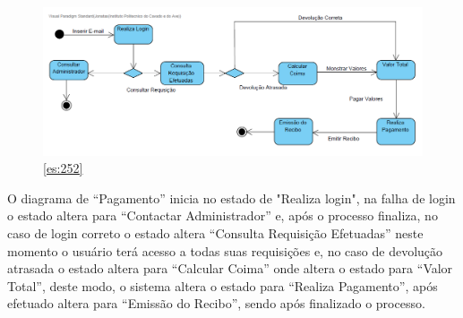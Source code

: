 \subsection{}

\begin{figure}[H]
	\centering
	\includegraphics[width=1\linewidth]{./img/Diagrama_E/DE_Pagamento.png}  %
	\caption{\ref{es:252}}
	\label{fig:chap252}
\end{figure}

\par O diagrama de “Pagamento” inicia no estado de "Realiza login", na falha de login o estado altera para “Contactar Administrador” e, após o processo finaliza, no caso de login correto o estado altera “Consulta Requisição Efetuadas” neste momento o usuário terá acesso a todas suas requisições e, no caso de devolução atrasada o estado altera para “Calcular Coima” onde altera o estado para “Valor Total”, deste modo, o sistema altera o estado para “Realiza Pagamento”, após efetuado altera para “Emissão do Recibo”, sendo após finalizado o processo.
